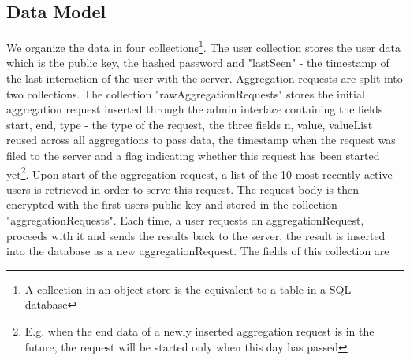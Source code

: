 \subsection{Data Model}
We organize the data in four collections\footnote{A collection in an object store is the equivalent to a table in a SQL database}. The user collection stores the user data which is the public key, the hashed password and "lastSeen" - the timestamp of the last interaction of the user with the server. Aggregation requests are split into two collections. The collection "rawAggregationRequests" stores the initial aggregation request inserted through the admin interface containing the fields start, end, type - the type of the request, the three fields n, value, valueList reused across all aggregations to pass data, the timestamp when the request was filed to the server and a flag indicating whether this request has been started yet\footnote{E.g. when the end data of a newly inserted aggregation request is in the future, the request will be started only when this day has passed}. Upon start of the aggregation request, a list of the 10 most recently active users is retrieved in order to serve this request. The request body is then encrypted with the first users public key and stored in the collection "aggregationRequests". Each time, a user requests an aggregationRequest, proceeds with it and sends the results back to the server, the result is inserted into the database as a new aggregationRequest. The fields of this collection are 
